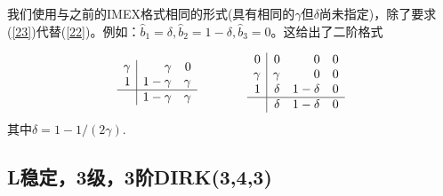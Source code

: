 \documentclass[12pt,a4paper]{article}
\numberwithin{equation}{section}
\begin{document}
我们使用与之前的IMEX格式相同的形式(具有相同的$\gamma$但$\delta$尚未指定)，除了要求(\ref{23})代替(\ref{22})。例如：$\widehat{b}_{1}=\delta,\widehat{b}_{2}=1-\delta,\widehat{b}_{3}=0$。这给出了二阶格式

\[
\begin{array}{r|rr}
\gamma & \gamma & 0\\
1 & 1-\gamma & \gamma \\
\hline
&1-\gamma & \gamma 
\end{array}~~~~~~~~~~~~
\begin{array}{r|rrr}
0 & 0 & 0 & 0 \\
\gamma & \gamma & 0 & 0\\
1 & \delta & 1-\delta & 0\\
\hline
& \delta & 1-\delta & 0
\end{array}
\]
其中$\delta=1-1/(2\gamma)$.

\subsection{L稳定，3级，3阶DIRK(3,4,3)}
\end{document}
